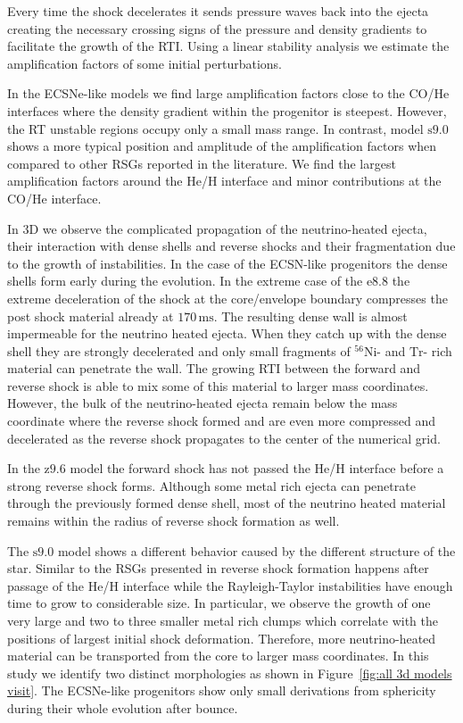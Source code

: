 \documentclass[fleqn,usenatbib]{mnras}
\newcommand{\nickel}{\ensuremath{\mathrm{^{56}Ni}}\xspace}
\newcommand{\tracer}{\ensuremath{\mathrm{Tr}}\xspace}
\newcommand{\ms}{\ensuremath{\text{ms}}}
\newcommand{\onemg}{\ensuremath{\mathrm{e8.8}}\xspace}
\newcommand{\snine}{\ensuremath{\mathrm{s9.0}}\xspace}
\newcommand{\znine}{\ensuremath{\mathrm{z9.6}}\xspace}
\begin{document}
Every time the shock decelerates it sends pressure waves back into
the ejecta creating the necessary crossing signs of the
pressure and density gradients to facilitate the growth of the RTI. 
Using a linear stability analysis we estimate the amplification
factors of some initial perturbations.

In the ECSNe-like models we find large amplification factors close to the CO/He 
interfaces where the density gradient within the progenitor is steepest. 
However, the RT unstable regions occupy only a small mass range.
In contrast, model \snine shows a more typical position and amplitude of the 
amplification factors when compared to other RSGs reported in the literature.
We find the largest amplification factors around the He/H 
interface and minor contributions at the CO/He interface.

In 3D we observe the complicated propagation of the neutrino-heated ejecta, 
their interaction with dense shells and reverse shocks and their
fragmentation due to the growth of instabilities.
In the case of the ECSN-like progenitors the dense shells form 
early during the evolution. 
In the extreme case of the \onemg the 
extreme deceleration of the shock at the core/envelope boundary compresses 
the post shock material already at $170 \, \ms$. The resulting dense wall 
is almost impermeable for the neutrino heated ejecta. When they catch
up with the dense shell they are strongly decelerated and only small
fragments of \nickel- and \tracer- rich material can penetrate the wall.
The growing RTI between the forward and reverse shock is able to mix some
of this material to larger mass coordinates.
However, the bulk of the neutrino-heated ejecta remain below the mass 
coordinate where the reverse shock formed and are even more compressed
and decelerated as the reverse shock propagates to the center of the numerical
grid.

In the \znine model the forward shock has not passed the He/H interface 
before a strong reverse shock forms. Although some metal rich ejecta can 
penetrate through the previously formed dense shell, most of the neutrino 
heated material remains within the radius of reverse shock formation as well.

The \snine model shows a different behavior caused by the different structure 
of the star. Similar to the RSGs presented in \cite{Wongwathanarat2015} reverse 
shock formation happens after passage of the He/H interface while the Rayleigh-Taylor 
instabilities have enough time to grow to considerable size. 
In particular, we observe the growth of one very large and two to three smaller 
metal rich clumps which correlate with the positions of largest initial shock
deformation.
Therefore, more neutrino-heated material can be transported from the core 
to larger mass coordinates. 
In this study we identify two distinct morphologies as shown in Figure~\ref{fig:all 3d models visit}.
The ECSNe-like progenitors show only small derivations from sphericity 
during their whole evolution after bounce.
\end{document}

